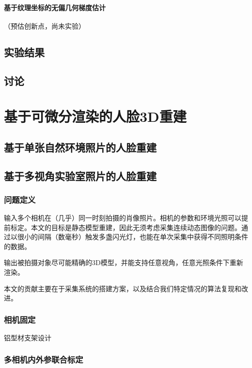 \documentclass{ctexart}
\begin{document}
\paragraph{基于纹理坐标的无偏几何梯度估计}（预估创新点，尚未实验）

\subsection{实验结果}

\subsection{讨论}

\section{基于可微分渲染的人脸3D重建}

\subsection{基于单张自然环境照片的人脸重建}

\subsection{基于多视角实验室照片的人脸重建}

\subsubsection{问题定义}

输入多个相机在（几乎）同一时刻拍摄的肖像照片。相机的参数和环境光照可以提前标定。本文的目标是静态模型重建，因此无须考虑采集连续动态图像的问题。通过以很小的间隔（数毫秒）触发多盏闪光灯，也能在单次采集中获得不同照明条件的数据。

输出被拍摄对象尽可能精确的3D模型，并能支持任意视角，任意光照条件下重新渲染。

本文的贡献主要在于采集系统的搭建方案，以及结合我们特定情况的算法复现和改进。

\subsubsection{相机固定}

铝型材支架设计

\subsubsection{多相机内外参联合标定}
\end{document}
